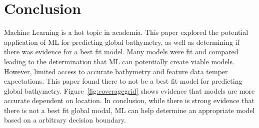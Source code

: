 \section{Conclusion}
\setlength{\parindent}{10ex}
Machine Learning is a hot topic in academia.
This paper explored the potential application of \ac{ML} for predicting global bathymetry, as well as determining if there was evidence for a best fit model.
Many models were fit and compared leading to the determination that \ac{ML} can potentially create viable models.
However, limited access to accurate bathymetry and feature data temper expectations.
This paper found there to not be a best fit model for predicting global bathymetry. 
Figure~\ref{fig:coveragegrid} shows evidence that models are more accurate dependent on location.
In conclusion, while there is strong evidence that there is not a best fit global modal, \ac{ML} can help determine an appropriate model based on a arbitrary decision boundary.